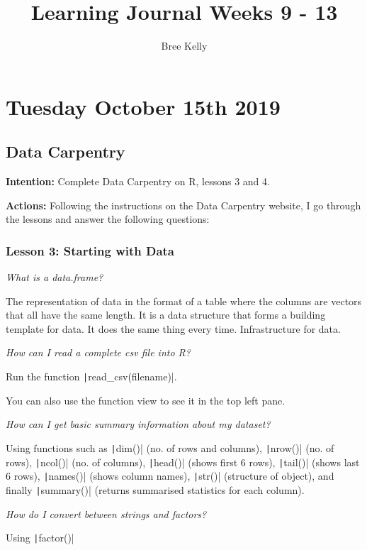 \documentclass{article}
\title{Learning Journal Weeks 9 - 13}
\author{Bree Kelly}
\date{}
\begin{document}
\maketitle

\tablesofcontentsanderrors

\newpage
\section{Tuesday October 15th 2019}

\subsection{Data Carpentry}
\textbf{Intention:} Complete Data Carpentry on R, lessons 3 and 4.

\textbf{Actions:} Following the instructions on the Data Carpentry website, I go through the lessons and answer the following questions:

\subsubsection{Lesson 3: Starting with Data}

\textit{What is a data.frame?}

The representation of data in the format of a table where the columns are vectors that all have the same length. It is a data structure that forms a building template for data. It does the same thing every time. Infrastructure for data.

\textit{How can I read a complete csv file into R?}

Run the function \texttt|read_csv(filename)|. 

You can also use the function view to see it in the top left pane.

\textit{How can I get basic summary information about my dataset?}

Using functions such as \texttt|dim()| (no. of rows and columns), \texttt|nrow()| (no. of rows), \texttt|ncol()| (no. of columns), \texttt|head()| (shows first 6 rows), \texttt|tail()| (shows last 6 rows), \texttt|names()| (shows column names), \texttt|str()| (structure of object), and finally \texttt|summary()| (returns summarised statistics for each column).

\textit{How do I convert between strings and factors?}

Using \texttt|factor()|
\end{document}
